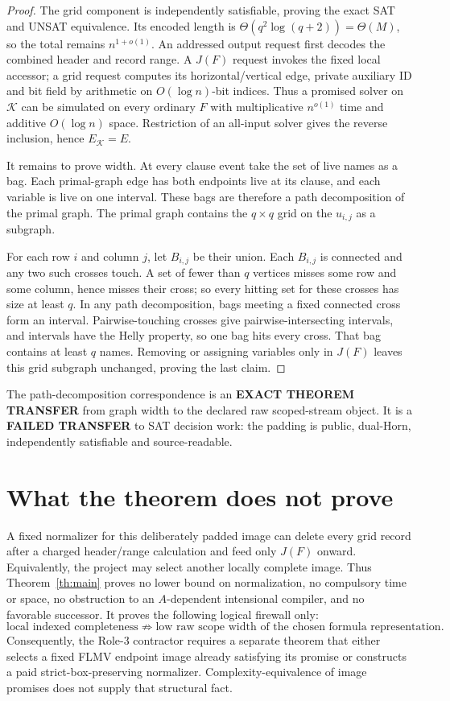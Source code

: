 \documentclass[11pt]{article}
\begin{document}
\begin{proof}
The grid component is independently satisfiable, proving the exact SAT and
UNSAT equivalence.  Its encoded length is
$\Theta(q^2\log(q+2))=\Theta(M)$, so the total remains
$n^{1+o(1)}$.  An addressed output request first decodes the combined header
and record range.  A $J(F)$ request invokes the fixed local accessor; a grid
request computes its horizontal/vertical edge, private auxiliary ID and bit
field by arithmetic on $O(\log n)$-bit indices.  Thus a promised solver on
$\mathcal K$ can be simulated on every ordinary $F$ with multiplicative
$n^{o(1)}$ time and additive $O(\log n)$ space.  Restriction of an all-input
solver gives the reverse inclusion, hence $E_{\mathcal K}=E$.

It remains to prove width.  At every clause event take the set of live names
as a bag.  Each primal-graph edge has both endpoints live at its clause, and
each variable is live on one interval.  These bags are therefore a path
decomposition of the primal graph.  The primal graph contains the
$q\times q$ grid on the $u_{i,j}$ as a subgraph.

For each row $i$ and column $j$, let $B_{i,j}$ be their union.  Each
$B_{i,j}$ is connected and any two such crosses touch.  A set of fewer than
$q$ vertices misses some row and some column, hence misses their cross; so
every hitting set for these crosses has size at least $q$.  In any path
decomposition, bags meeting a fixed connected cross form an interval.
Pairwise-touching crosses give pairwise-intersecting intervals, and intervals
have the Helly property, so one bag hits every cross.  That bag contains at
least $q$ names.  Removing or assigning variables only in $J(F)$ leaves this
grid subgraph unchanged, proving the last claim.
\end{proof}

The path-decomposition correspondence is an \textbf{EXACT THEOREM TRANSFER}
from graph width to the declared raw scoped-stream object.  It is a
\textbf{FAILED TRANSFER} to SAT decision work: the padding is public,
dual-Horn, independently satisfiable and source-readable.

\section{What the theorem does not prove}
A fixed normalizer for this deliberately padded image can delete every grid
record after a charged header/range calculation and feed only $J(F)$ onward.
Equivalently, the project may select another locally complete image.  Thus
Theorem~\ref{th:main} proves no lower bound on normalization, no compulsory
time or space, no obstruction to an $A$-dependent intensional compiler, and
no favorable successor.  It proves the following logical firewall only:
\[
 \boxed{\text{local indexed completeness}}
 \not\Longrightarrow
 \boxed{\text{low raw scope width of the chosen formula representation}}.
\]
Consequently, the Role-3 contractor requires a separate theorem that either
selects a fixed FLMV endpoint image already satisfying its promise or
constructs a paid strict-box-preserving normalizer.  Complexity-equivalence
of image promises does not supply that structural fact.
\end{document}
